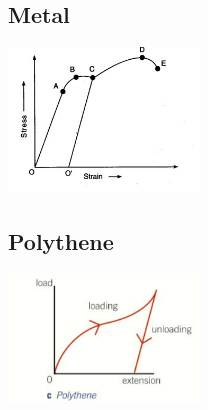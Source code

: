 \documentclass{article}[18pt]
\begin{document}
\subsection{Metal}
\includegraphics[width=2in]{metal.jpg}\\
\subsection{Polythene}
\includegraphics[width=2in]{Polythene.png}\\
\end{document}
